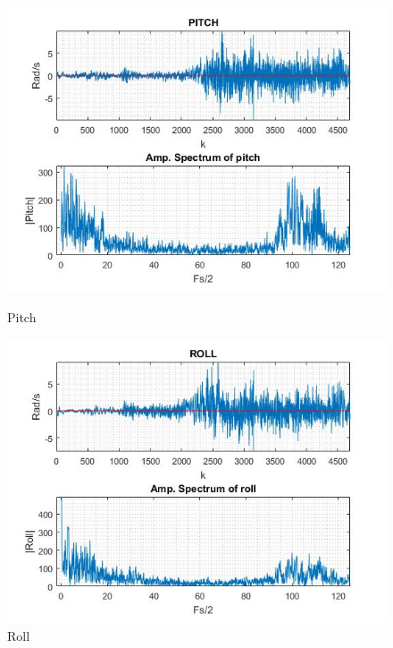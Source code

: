\begin{figure}[H]
        \centering
            \begin{minipage}[b]{0.32\textwidth}
                \includegraphics[width = \textwidth, angle= 0]{VAPIQ-PICTURES/PITCH1.jpg}
                \caption{Pitch}
                    \label{fig:Pitch}
            \end{minipage}
            \hfill
            \begin{minipage}[b]{0.32\textwidth}
                \includegraphics[width =\textwidth, angle =0]{VAPIQ-PICTURES/ROLL1.jpg}
                \caption{Roll}
                \label{fig:Roll}
            \end{minipage}

\end{figure}
